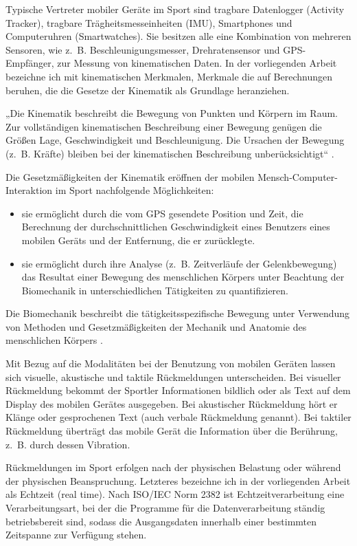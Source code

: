 Typische Vertreter mobiler Geräte im Sport sind tragbare Datenlogger (Activity Tracker), tragbare Trägheitsmesseinheiten (\ac{IMU}), Smartphones und Computeruhren (Smartwatches). Sie besitzen alle eine Kombination von mehreren Sensoren, wie z.~B. Beschleunigungsmesser, Drehratensensor und \ac{GPS}-Empfänger, zur Messung von kinematischen Daten. In der vorliegenden Arbeit bezeichne ich mit kinematischen Merkmalen, Merkmale die auf Berechnungen beruhen, die die Gesetze der Kinematik als Grundlage heranziehen.

„Die Kinematik beschreibt die Bewegung von Punkten und Körpern im Raum. Zur vollständigen kinematischen Beschreibung einer Bewegung genügen die Größen Lage, Geschwindigkeit und Beschleunigung. Die Ursachen der Bewegung (z.~B. Kräfte) bleiben bei der kinematischen Beschreibung unberücksichtigt“ \citep[][S.~57]{Disselhorst-Klug2015}.

Die Gesetzmäßigkeiten der Kinematik eröffnen der mobilen Mensch-Computer-Interaktion im Sport nachfolgende Möglichkeiten:
\begin{itemize}
	\item sie ermöglicht durch die vom \ac{GPS} gesendete Position und Zeit, die Berechnung der durchschnittlichen Geschwindigkeit eines Benutzers eines mobilen Geräts und der Entfernung, die er zurücklegte. 
	\item sie ermöglicht durch ihre Analyse (z.~B. Zeitverläufe der Gelenkbewegung) das Resultat einer Bewegung des menschlichen Körpers unter Beachtung der Biomechanik in unterschiedlichen Tätigkeiten zu quantifizieren. 
\end{itemize}

Die Biomechanik beschreibt die tätigkeitsspezifische Bewegung unter Verwendung von Methoden und Gesetzmäßigkeiten der Mechanik und Anatomie des menschlichen Körpers \citep[][ S.~2~ff.]{Winter2009}.

Mit Bezug auf die Modalitäten bei der Benutzung von mobilen Geräten lassen sich visuelle, akustische und taktile Rückmeldungen unterscheiden. Bei visueller Rückmeldung bekommt der Sportler Informationen bildlich oder als Text auf dem Display des mobilen Gerätes ausgegeben. Bei akustischer Rückmeldung hört er Klänge oder gesprochenen Text (auch verbale Rückmeldung genannt). Bei taktiler Rückmeldung überträgt das mobile Gerät die Information über die Berührung, z.~B. durch dessen Vibration.

Rückmeldungen im Sport erfolgen nach der physischen Belastung oder während der physischen Beanspruchung. Letzteres bezeichne ich in der vorliegenden Arbeit als Echtzeit (real time). Nach ISO/IEC Norm 2382 ist Echtzeitverarbeitung eine Verarbeitungsart, bei der die Programme für die Datenverarbeitung ständig betriebsbereit sind, sodass die Ausgangsdaten innerhalb einer bestimmten Zeitspanne zur Verfügung stehen.

